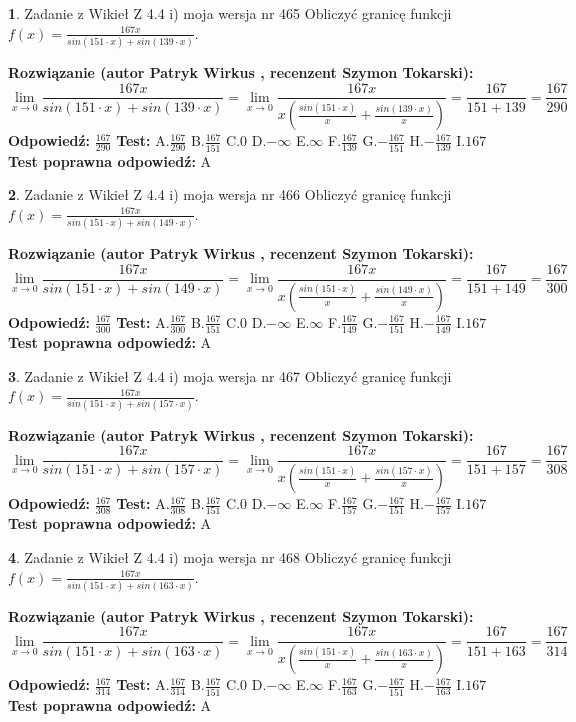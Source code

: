 \documentclass[12pt, a4paper]{article}
\theoremstyle{definition} %
\newtheorem{zad}{}
\newcommand{\zadStart}[1]{\begin{zad}#1\newline}
\newcommand{\zadStop}{\end{zad}}
\newcommand{\rozwStart}[2]{\noindent \textbf{Rozwiązanie (autor #1 , recenzent #2): }\newline}
\newcommand{\rozwStop}{\newline}
\newcommand{\odpStart}{\noindent \textbf{Odpowiedź:}\newline}
\newcommand{\odpStop}{\newline}
\newcommand{\testStart}{\noindent \textbf{Test:}\newline}
\newcommand{\testStop}{\newline}
\newcommand{\kluczStart}{\noindent \textbf{Test poprawna odpowiedź:}\newline}
\newcommand{\kluczStop}{\newline}
\begin{document}
\zadStart{Zadanie z Wikieł Z 4.4 i) moja wersja nr 465}
Obliczyć granicę funkcji $f(x)=\frac{167x}{sin(151\cdot x) +sin(139\cdot x)}$.
\zadStop
\rozwStart{Patryk Wirkus}{Szymon Tokarski}
$$\lim\limits_{x\to 0}\frac{167x}{sin(151\cdot x) +sin(139\cdot x)}=\lim\limits_{x\to 0}\frac{167x}{x(\frac{sin(151\cdot x)}{x}+\frac{sin(139\cdot x)}{x})}=\frac{167}{151+139} = \frac{167}{290}$$
\rozwStop
\odpStart
$\frac{167}{290}$
\odpStop
\testStart
A.$\frac{167}{290}$
B.$\frac{167}{151}$
C.$0$
D.$-\infty$
E.$\infty$
F.$\frac{167}{139}$
G.$-\frac{167}{151}$
H.$-\frac{167}{139}$
I.$167$
\testStop
\kluczStart
A
\kluczStop



\zadStart{Zadanie z Wikieł Z 4.4 i) moja wersja nr 466}
Obliczyć granicę funkcji $f(x)=\frac{167x}{sin(151\cdot x) +sin(149\cdot x)}$.
\zadStop
\rozwStart{Patryk Wirkus}{Szymon Tokarski}
$$\lim\limits_{x\to 0}\frac{167x}{sin(151\cdot x) +sin(149\cdot x)}=\lim\limits_{x\to 0}\frac{167x}{x(\frac{sin(151\cdot x)}{x}+\frac{sin(149\cdot x)}{x})}=\frac{167}{151+149} = \frac{167}{300}$$
\rozwStop
\odpStart
$\frac{167}{300}$
\odpStop
\testStart
A.$\frac{167}{300}$
B.$\frac{167}{151}$
C.$0$
D.$-\infty$
E.$\infty$
F.$\frac{167}{149}$
G.$-\frac{167}{151}$
H.$-\frac{167}{149}$
I.$167$
\testStop
\kluczStart
A
\kluczStop



\zadStart{Zadanie z Wikieł Z 4.4 i) moja wersja nr 467}
Obliczyć granicę funkcji $f(x)=\frac{167x}{sin(151\cdot x) +sin(157\cdot x)}$.
\zadStop
\rozwStart{Patryk Wirkus}{Szymon Tokarski}
$$\lim\limits_{x\to 0}\frac{167x}{sin(151\cdot x) +sin(157\cdot x)}=\lim\limits_{x\to 0}\frac{167x}{x(\frac{sin(151\cdot x)}{x}+\frac{sin(157\cdot x)}{x})}=\frac{167}{151+157} = \frac{167}{308}$$
\rozwStop
\odpStart
$\frac{167}{308}$
\odpStop
\testStart
A.$\frac{167}{308}$
B.$\frac{167}{151}$
C.$0$
D.$-\infty$
E.$\infty$
F.$\frac{167}{157}$
G.$-\frac{167}{151}$
H.$-\frac{167}{157}$
I.$167$
\testStop
\kluczStart
A
\kluczStop



\zadStart{Zadanie z Wikieł Z 4.4 i) moja wersja nr 468}
Obliczyć granicę funkcji $f(x)=\frac{167x}{sin(151\cdot x) +sin(163\cdot x)}$.
\zadStop
\rozwStart{Patryk Wirkus}{Szymon Tokarski}
$$\lim\limits_{x\to 0}\frac{167x}{sin(151\cdot x) +sin(163\cdot x)}=\lim\limits_{x\to 0}\frac{167x}{x(\frac{sin(151\cdot x)}{x}+\frac{sin(163\cdot x)}{x})}=\frac{167}{151+163} = \frac{167}{314}$$
\rozwStop
\odpStart
$\frac{167}{314}$
\odpStop
\testStart
A.$\frac{167}{314}$
B.$\frac{167}{151}$
C.$0$
D.$-\infty$
E.$\infty$
F.$\frac{167}{163}$
G.$-\frac{167}{151}$
H.$-\frac{167}{163}$
I.$167$
\testStop
\kluczStart
A
\kluczStop
\end{document}
